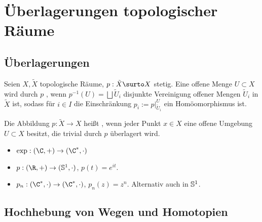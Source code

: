 \chapter{Überlagerungen topologischer Räume}


\section{Überlagerungen}


\begin{df}
    Seien $X, \tilde X$ topologische Räume, $p: \tilde X \surto X$ stetig.
    Eine offene Menge $U \subset X$ wird durch $p$ , wenn $p^{-1}(U) = \bigsqcup \tilde U_i$ disjunkte Vereinigung offener Mengen $\tilde U_i$ in $\tilde X$ ist, sodass für $i \in I$ die Einschränkung $p_i := p|_{\tilde U_i}^U$ ein Homöomorphismus ist.

    Die Abbildung $p: \tilde X \to X$ heißt , wenn jeder Punkt $x \in X$ eine offene Umgebung $U \subset X$ besitzt, die trivial durch $p$ überlagert wird.
\end{df}

\begin{ex}
    \begin{itemize}
        \item
            $\exp: (\C, +) \to (\C^*, \cdot)$
        \item
            $p: (\R, +) \to (\S^1, \cdot)$, $p(t) = e^{it}$.
        \item
            $p_n: (\C^*, \cdot) \to (\C^*, \cdot)$, $p_n(z) = z^n$.
            Alternativ auch in $\S^1$.
    \end{itemize}
\end{ex}

\section{Hochhebung von Wegen und Homotopien}


